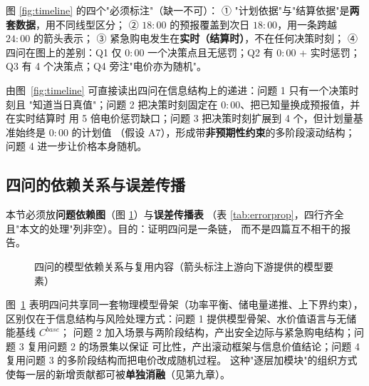 \begin{guideblock}
图 \ref{fig:timeline} 的四个"必须标注"（缺一不可）：
① "计划依据"与"结算依据"是\textbf{两套数据}，用不同线型区分；
② \(18{:}00\) 的预报覆盖到次日 \(18{:}00\)，用一条跨越 \(24{:}00\) 的箭头表示；
③ 紧急购电发生在\textbf{实时（结算时）}，不在任何决策时刻；
④ 四问在图上的差别：Q1 仅 \(0{:}00\) 一个决策点且无惩罚；Q2 有 \(0{:}00\) + 实时惩罚；
   Q3 有 4 个决策点；Q4 旁注"电价亦为随机"。
\end{guideblock}

由图~\ref{fig:timeline} 可直接读出四问在信息结构上的递进：问题 1 只有一个决策时刻且
"知道当日真值"；问题 2 把决策时刻固定在 \(0{:}00\)、把已知量换成预报值，并在实时结算时
用 5 倍电价惩罚缺口；问题 3 把决策时刻扩展到 4 个，但计划量基准始终是 \(0{:}00\) 的计划值
（假设 A7），形成带\textbf{非预期性约束}的多阶段滚动结构；问题 4 进一步让价格本身随机。

\subsection{四问的依赖关系与误差传播}

\begin{guideblock}
本节必须放\textbf{问题依赖图}（图 \ref{fig:dependency}）与\textbf{误差传播表}
（表 \ref{tab:errorprop}，四行齐全且"本文的处理"列非空）。目的：证明四问是一条链，
而不是四篇互不相干的报告。
\end{guideblock}

\begin{figure}[htbp]
  \centering
  
  \caption{四问的模型依赖关系与复用内容（箭头标注上游向下游提供的模型要素）}
  \label{fig:dependency}
\end{figure}

图~\ref{fig:dependency} 表明四问共享同一套物理模型骨架（功率平衡、储电量递推、上下界约束），
区别仅在于信息结构与风险处理方式：问题 1 提供模型骨架、水价值语言与无储能基线 \(C^{base}\)；
问题 2 加入场景与两阶段结构，产出安全边际与紧急购电结构；问题 3 复用问题 2 的场景集以保证
可比性，产出滚动框架与信息价值结论；问题 4 复用问题 3 的多阶段结构而把电价改成随机过程。
这种"逐层加模块"的组织方式使每一层的新增贡献都可被\textbf{单独消融}（见第九章）。

